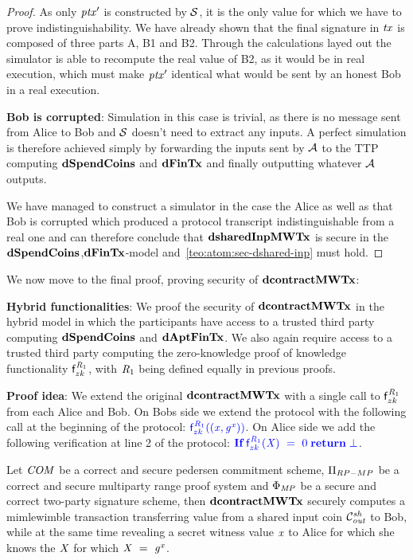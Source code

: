 \begin{proof}
    As only ${\mathit{ptx}}'$ is constructed by $\mathcal{S}$, it is the only value for which we have to prove indistinguishability.
    We have already shown that the final signature in $\mathit{tx}$ is composed of three parts A, B1 and B2.
    Through the calculations layed out the simulator is able to recompute the real value of B2, as it would be in real execution, which must make ${\mathit{ptx}}'$ identical what would be sent by an honest Bob in a real execution.

    \textbf{Bob is corrupted}: Simulation in this case is trivial, as there is no message sent from Alice to Bob and $\mathcal{S}$ doesn't need to extract any inputs.
    A perfect simulation is therefore achieved simply by forwarding the inputs sent by $\mathcal{A}$ to the TTP computing $\mathbf{dSpendCoins}$ and $\mathbf{dFinTx}$ and finally outputting whatever $\mathcal{A}$ outputs.

    We have managed to construct a simulator in the case the Alice as well as that Bob is corrupted which produced a protocol transcript indistinguishable from a real one and can therefore conclude that $\mathbf{dsharedInpMWTx}$ is secure in the $\mathbf{dSpendCoins}$,$\mathbf{dFinTx}$-model and~\cref{teo:atom:sec-dshared-inp} must hold.
\end{proof}

We now move to the final proof, proving security of $\mathbf{dcontractMWTx}$:

\textbf{Hybrid functionalities}: We proof the security of $\mathbf{dcontractMWTx}$ in the hybrid model in which the participants have access to a trusted third party computing $\mathbf{dSpendCoins}$ and $\mathbf{dAptFinTx}$.
We also again require access to a trusted third party computing the zero-knowledge proof of knowledge functionality $\mathsf{f}^{\mathit{R}_1}_{zk}$, with $\mathit{R}_1$ being defined equally in previous proofs.

\textbf{Proof idea}: We extend the original $\mathbf{dcontractMWTx}$ with a single call to $\mathsf{f}^{\mathit{R}_1}_{zk}$ from each Alice and Bob.
On Bobs side we extend the protocol with the following call at the beginning of the protocol: $\color{blue} \mathsf{f}^{\mathit{R}_1}_{zk}((\mathit{x}, \mathit{g}^{\mathit{x}}))$.
On Alice side we add the following verification at line 2 of the protocol: $\color{blue} \textbf{If}\; \mathsf{f}^{\mathit{R}_1}_{zk}(\mathit{X}) ~=~ 0 \; \textbf{return}\; \bot$.

\begin{theorem} \label{teo:atom:sec-dcontract-mw}
    Let $\mathit{COM}$ be a correct and secure pedersen commitment scheme, $\Pi_{RP-MP}$ be a correct and secure multiparty range proof system and $\Phi_{\mathit{MP}}$ be a secure and correct two-party signature scheme, then $\mathbf{dcontractMWTx}$ securely computes a mimlewimble transaction transferring value from a shared input coin $\mathcal{C}_{\mathit{out}}^{\mathit{sh}}$ to Bob, while at the same time revealing a secret witness value $\mathit{x}$ to Alice for which she knows the $\mathit{X}$ for which $\mathit{X} ~=~ \mathit{g}^{\mathit{x}}$.
\end{theorem}

